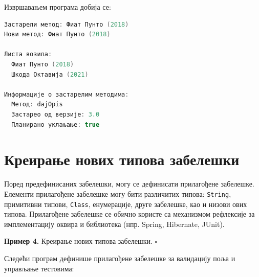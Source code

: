 Извршавањем програма добија се:

\begin{lstlisting}[language=Java]
Застарели метод: Фиат Пунто (2018)
Нови метод: Фиат Пунто (2018)
 
Листа возила:
  Фиат Пунто (2018)
  Шкода Октавија (2021)
 
Информације о застарелим методима:
  Метод: dajOpis
  Застарео од верзије: 3.0
  Планирано уклањање: true
\end{lstlisting}

\section{Креирање нових типова забелешки}

Поред предефинисаних забелешки, могу се дефинисати прилагођене забелешке. Елементи прилагођене забелешке могу бити различитих типова: \texttt{String}, примитивни типови, \texttt{Class}, енумерације, друге забелешке, као и низови ових типова. Прилагођене забелешке се обично користе са механизмом рефлексије за имплементацију оквира и библиотека (нпр. Spring, Hibernate, JUnit).


\bigskip

\noindent \textbf{Пример 4.} Креирање нових типова забелешки. $\square$

\medskip

Следећи програм дефинише прилагођене забелешке за валидацију поља и управљање тестовима:


